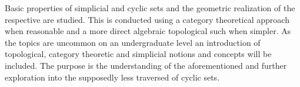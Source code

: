 \documentclass[../main.tex]{subfiles}
\begin{document}
    Basic properties of simplicial and cyclic sets and the geometric realization of the respective are studied. This is conducted using a category theoretical approach when reasonable and a more direct algebraic topological such when simpler.  As the topics are uncommon on an undergraduate level an introduction of topological, category theoretic and simplicial notions and concepts will be included. The purpose is the understanding of the aforementioned and further exploration into the supposedly less traversed of cyclic sets. 
\end{document}
